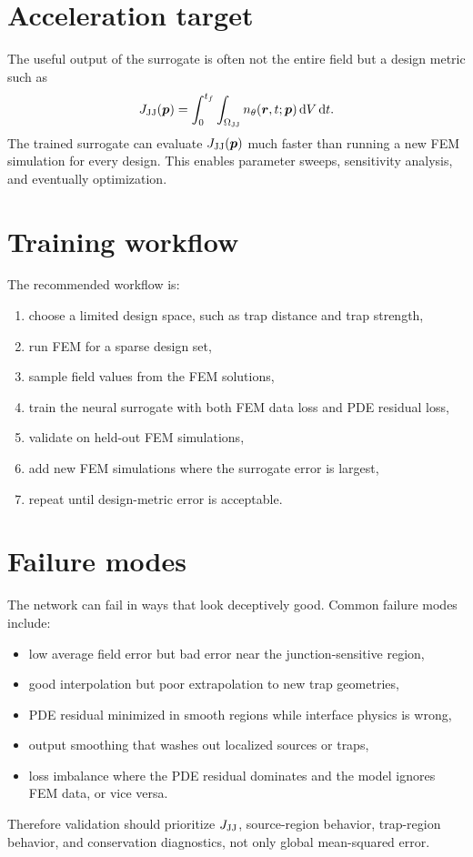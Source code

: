 \documentclass[11pt]{article}
\begin{document}
\section{Acceleration target}
The useful output of the surrogate is often not the entire field but a design metric such as
\begin{equation}
J_{\mathrm{JJ}}(\bm{p})=\int_0^{t_f}\int_{\Omega_{\mathrm{JJ}}}n_\theta(\bm{r},t;\bm{p})\,\dd V\,\dd t.
\end{equation}
The trained surrogate can evaluate $J_{\mathrm{JJ}}(\bm{p})$ much faster than running a new FEM simulation for every design. This enables parameter sweeps, sensitivity analysis, and eventually optimization.

\section{Training workflow}
The recommended workflow is:
\begin{enumerate}[leftmargin=1.6em]
    \item choose a limited design space, such as trap distance and trap strength,
    \item run FEM for a sparse design set,
    \item sample field values from the FEM solutions,
    \item train the neural surrogate with both FEM data loss and PDE residual loss,
    \item validate on held-out FEM simulations,
    \item add new FEM simulations where the surrogate error is largest,
    \item repeat until design-metric error is acceptable.
\end{enumerate}

\section{Failure modes}
The network can fail in ways that look deceptively good. Common failure modes include:
\begin{itemize}[leftmargin=1.6em]
    \item low average field error but bad error near the junction-sensitive region,
    \item good interpolation but poor extrapolation to new trap geometries,
    \item PDE residual minimized in smooth regions while interface physics is wrong,
    \item output smoothing that washes out localized sources or traps,
    \item loss imbalance where the PDE residual dominates and the model ignores FEM data, or vice versa.
\end{itemize}
Therefore validation should prioritize $J_{\mathrm{JJ}}$, source-region behavior, trap-region behavior, and conservation diagnostics, not only global mean-squared error.
\end{document}
